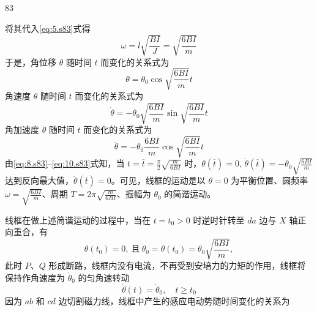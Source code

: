 \begin{solution}{83}
\begin{subsolution}
\begin{subsubsolution}
            将其代入\eqref{eq:5.s83}式得
            \begin{equation}
                \omega = l \sqrt{\frac{B I}{J}} = \sqrt{\frac{6 B I}{m}}
                \label{eq:7.s83}
            \end{equation}
            于是，角位移 $\theta$ 随时间 $t$ 而变化的关系式为
            \begin{equation}
                \theta = \theta_{0} \cos \sqrt{\frac{6 B I}{m}} t
                \label{eq:8.s83}
            \end{equation}
            角速度 $\dot{\theta}$ 随时间 $t$ 而变化的关系式为
            \begin{equation}
                \dot{\theta} = - \theta_{0} \sqrt{\frac{6 B I}{m}} \sin \sqrt{\frac{6 B I}{m}} t
                \label{eq:9.s83}
            \end{equation}
            角加速度 $\ddot{\theta}$ 随时间 $t$ 而变化的关系式为
            \begin{equation}
                \ddot{\theta} = - \theta_{0} \frac{6 B I}{m} \cos \sqrt{\frac{6 B I}{m}} t
                \label{eq:10.s83}
            \end{equation}
            由\eqref{eq:8.s83}--\eqref{eq:10.s83}式知，当 $t=\overline{t}=\frac{\pi}{2}\sqrt{\frac{m}{6BI}}$ 时，$\theta(\overline{t})=0$, $\dot{\theta}(\overline{t})=-\theta_{0}\sqrt{\frac{6BI}{m}}$ 达到反向最大值，$\ddot{\theta}(\overline{t})=0$。可见，线框的运动是以 $\theta=0$ 为平衡位置、圆频率 $\omega=\sqrt{\frac{6BI}{m}}$、周期 $T=2\pi\sqrt{\frac{m}{6BI}}$、振幅为 $\theta_{0}$ 的简谐运动。
        \end{subsubsolution}
        \begin{subsubsolution}
            线框在做上述简谐运动的过程中，当在 $t=t_{0}>0$ 时逆时针转至 $da$ 边与 $X$ 轴正向重合，有
            \begin{equation}
                \theta(t_{0}) = 0,\ \text{且}\ \dot{\theta}_{0} = \dot{\theta}(t_{0}) = \theta_{0} \sqrt{\frac{6 B I}{m}},
                \label{eq:11.s83}
            \end{equation}
            此时 $P$、$Q$ 形成断路，线框内没有电流，不再受到安培力的力矩的作用，线框将保持作角速度为 $\dot{\theta}_{0}$ 的匀角速转动
            \begin{equation}
                \dot{\theta}(t) = \dot{\theta}_{0}, \quad t \geq t_{0}
                \label{eq:12.s83}
            \end{equation}
            因为 $ab$ 和 $cd$ 边切割磁力线，线框中产生的感应电动势随时间变化的关系为

\end{subsubsolution}
\end{subsolution}
\end{solution}
